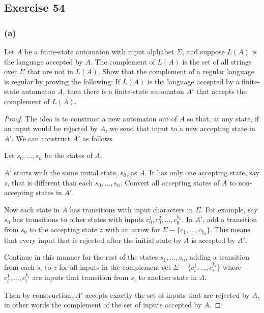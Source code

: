 \documentclass[14pt]{extarticle}
\begin{document}
\subsection{Exercise 54}
\subsubsection{(a)}
Let \(A\) be a finite-state automaton with input alphabet \(\Sigma\), and suppose \(L(A)\) is the language accepted by
\(A\). The complement of \(L(A)\) is the set of all strings over \(\Sigma\) that are not in \(L(A)\). Show that the
complement of a regular language is regular by proving the following: If \(L(A)\) is the language accepted by a
finite-state automaton \(A\), then there is a finite-state automaton \(A'\) that accepts the complement of \(L(A)\).

\begin{proof}
    The idea is to construct a new automaton out of \(A\) so that, at any state, if an input would be rejected by \(A\), we send
    that input to a new accepting state in \(A'\). We can construct \(A'\) as follows.

    Let \(s_0, \ldots, s_n\) be the states of \(A\).

    \(A'\) starts with the same initial state, \(s_0\), as \(A\). It has only one accepting state, say \(z\), that is different
    than each \(s_0, \ldots, s_n\). Convert all accepting states of \(A\) to non-accepting states in \(A'\).

    Now each state in \(A\) has transitions with input characters in \(\Sigma\). For example, say \(s_0\) has transitions to
    other states with inputs \(c_0^1, c_0^2, \ldots, c_0^{k_0}\). In \(A'\), add a transition from \(s_0\) to the accepting
    state \(z\) with an arrow for \(\Sigma - \{c_1, \ldots, c_{k_0}\}\). This means that every input that is rejected
    after the initial state by \(A\) is accepted by \(A'\).

    Continue in this manner for the rest of the states \(s_1, \ldots, s_n\), adding a transition from each \(s_i\) to \(z\)
    for all inputs in the complement set \(\Sigma - \{c_i^1, \ldots, c_i^{k_i}\}\) where \(c_i^1, \ldots, c_i^{k_i}\) are
    inputs that transition from \(s_i\) to another state in \(A\).

    Then by construction, \(A'\) accepts exactly the set of inputs that are rejected by \(A\), in other words the complement of
    the set of inputs accepted by \(A\).
\end{proof}
\end{document}
